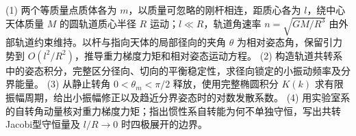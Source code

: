 (1) 两个等质量点质体各为 \(m\)，以质量可忽略的刚杆相连，距质心各为 \(l\)，绕中心天体质量 \(M\) 的圆轨道质心半径 \(R\) 运动；\(l\ll R\)，轨道角速率 \(n=\sqrt{GM/R^3}\) 由外部轨道约束维持。以杆与指向天体的局部径向的夹角 \(\theta\) 为相对姿态角，保留引力势到 \(O(l^2/R^2)\)，推导重力梯度力矩和相对姿态运动方程。
(2) 构造轨道共转系中的姿态积分，完整区分径向、切向的平衡稳定性，求径向锁定的小振动频率及分界能量。
(3) 从静止转角 \(0<\theta_m<\pi/2\) 释放，使用完整椭圆积分 \(K(k)\) 求有限振幅周期，给出小振幅修正以及趋近分界姿态时的对数发散系数。
(4) 用实验室系的自转角动量核对重力梯度力矩；指出惯性系自转能为何不单独守恒，写出共转Jacobi型守恒量及 \(l/R\to0\) 时四极展开的边界。
